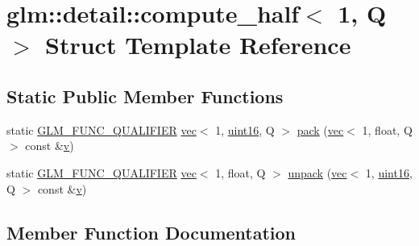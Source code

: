 \hypertarget{structglm_1_1detail_1_1compute__half_3_011_00_01_q_01_4}{}\section{glm\+:\+:detail\+:\+:compute\+\_\+half$<$ 1, Q $>$ Struct Template Reference}
\label{structglm_1_1detail_1_1compute__half_3_011_00_01_q_01_4}
\subsection*{Static Public Member Functions}
\begin{DoxyCompactItemize}
\item 
static \hyperlink{setup_8hpp_a33fdea6f91c5f834105f7415e2a64407}{G\+L\+M\+\_\+\+F\+U\+N\+C\+\_\+\+Q\+U\+A\+L\+I\+F\+I\+ER} \hyperlink{structglm_1_1vec}{vec}$<$ 1, \hyperlink{namespaceglm_1_1detail_a47b2a7d006d187338e8031a352d1ce56}{uint16}, Q $>$ \hyperlink{structglm_1_1detail_1_1compute__half_3_011_00_01_q_01_4_adf3bd584754baf5ce34453bf4174a658}{pack} (\hyperlink{structglm_1_1vec}{vec}$<$ 1, float, Q $>$ const \&\hyperlink{_s_d_l__opengl_8h_a10a82eabcb59d2fcd74acee063775f90}{v})
\item 
static \hyperlink{setup_8hpp_a33fdea6f91c5f834105f7415e2a64407}{G\+L\+M\+\_\+\+F\+U\+N\+C\+\_\+\+Q\+U\+A\+L\+I\+F\+I\+ER} \hyperlink{structglm_1_1vec}{vec}$<$ 1, float, Q $>$ \hyperlink{structglm_1_1detail_1_1compute__half_3_011_00_01_q_01_4_a746beaa20b378bd4b7680b786c31e2c5}{unpack} (\hyperlink{structglm_1_1vec}{vec}$<$ 1, \hyperlink{namespaceglm_1_1detail_a47b2a7d006d187338e8031a352d1ce56}{uint16}, Q $>$ const \&\hyperlink{_s_d_l__opengl_8h_a10a82eabcb59d2fcd74acee063775f90}{v})
\end{DoxyCompactItemize}


\subsection{Member Function Documentation}
\mbox{\label{structglm_1_1detail_1_1compute__half_3_011_00_01_q_01_4_adf3bd584754baf5ce34453bf4174a658}} 
